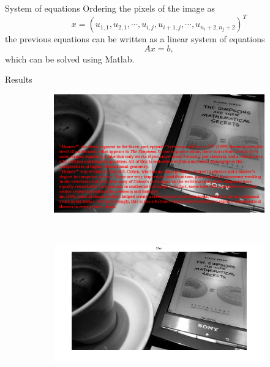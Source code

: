 \documentclass[11pt]{beamer}
\begin{document}
\begin{frame}{System of equations}
Ordering the pixels of the image as
$$x = (u_{1,1}, u_{2,1}, \cdots, u_{i, j}, u_{i+1, j}, \cdots ,u_{n_i + 2,n_j + 2})^T$$
the previous equations can be written as a linear system of equations 
$$Ax = b,$$
which can be solved using Matlab.
\end{frame}

\begin{frame}{Results}

\begin{figure}
    \centering
    \begin{subfigure}[b]{0.5\textwidth}
        \includegraphics[width=\textwidth]{image5_toRestore}

    \end{subfigure}
    ~ 
        \begin{subfigure}[b]{0.6\textwidth}
        \includegraphics[width=\textwidth]{image5_Restored}

    \end{subfigure}

\end{figure}

\end{frame}
\end{document}
